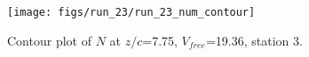 \begin{figure}[H]
\centering
\texttt{[image: figs/run\_23/run\_23\_num\_contour]}
\caption{Contour plot of $N$ at $z/c$=7.75, $V_{free}$=19.36, station 3.}
\label{fig:run_23_num_contour}
\end{figure}


